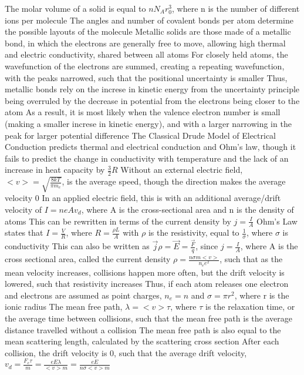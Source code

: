 \documentclass[11 pt, twoside]{article}
\newenvironment{outline*}
{
	\begin{outline}[enumerate]
	}
	{\end{outline}
}
\begin{document}
\begin{outline*}
		\3 The molar volume of a solid is equal to $nN_Ar_0^3$, where n is the number of different ions per molecule
		\3 The angles and number of covalent bonds per atom determine the possible layouts of the molecule
	\2 Metallic solids are those made of a metallic bond, in which the electrons are generally free to move, allowing high thermal and electric conductivity, shared between all atoms
		\3 For closely held atoms, the wavefunction of the electrons are summed, creating a repeating wavefunction, with the peaks narrowed, such that the positional uncertainty is smaller
		\3 Thus, metallic bonds rely on the increse in kinetic energy from the uncertainty principle being overruled by the decrease in potential from the electrons being closer to the atom
			\4 As a result, it is most likely when the valence electron number is small (making a smaller increse in kinetic energy), and with a larger narrowing in the peak for larger potential difference
\1 The Classical Drude Model of Electrical Conduction predicts thermal and electrical conduction and Ohm's law, though it fails to predict the change in conductivity with temperature and the lack of an increase in heat capacity by $\frac{3}{2}R$
	\2 Without an external electric field, $<v> = \sqrt{\frac{8kT}{\pi m_e}}$, is the average speed, though the direction makes the average velocity 0
		\3 In an applied electric field, this is with an additional average/drift velocity of $I = neAv_d$, where A is the cross-sectional area and n is the density of atoms
		\3 This can be rewritten in terms of the current density by $j = \frac{I}{A}$
		\3 Ohm's Law states that $I = \frac{V}{R}$, where $R = \frac{\rho L}{A}$ with $\rho$ is the resistivity, equal to $\frac{1}{\sigma}$, where $\sigma$ is conductivity
			\4 This can also be written as $\vec{j}\rho = \vec{E} = \frac{\vec{F}}{q}$, since $j = \frac{I}{A}$, where A is the cross sectional area, called the current density
			\4 $\rho = \frac{n\sigma m <v>}{n_e e^2}$, such that as the mean velocity increases, collisions happen more often, but the drift velocity is lowered, such that resistivity increases
			\4 Thus, if each atom releases one electron and electrons are assumed as point charges, $n_e = n$ and $\sigma = \pi r^2$, where r is the ionic radius
	\2 The mean free path, $\lambda = <v>\tau$, where $\tau$ is the relaxation time, or the average time between collisions, such that the mean free path is the average distance travelled without a collision
		\3 The mean free path is also equal to the mean scattering length, calculated by the scattering cross section
		\3 After each collision, the drift velocity is 0, such that the average drift velocity, $v_d = \frac{F_e\tau}{m} = \frac{eE\lambda}{<v>m} = \frac{eE}{n\sigma <v> m}$

\end{outline*}
\end{document}
